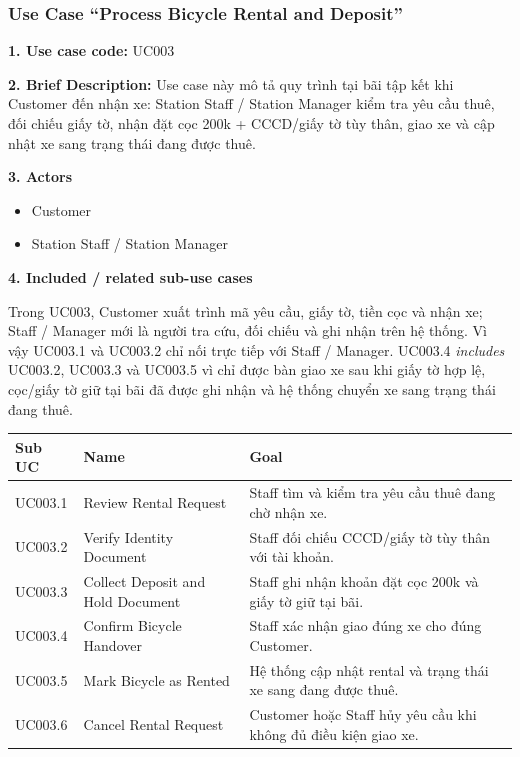 \newpage
\subsubsection{Use Case ``Process Bicycle Rental and Deposit''}

\textbf{1. Use case code:} UC003

\textbf{2. Brief Description:} Use case này mô tả quy trình tại bãi tập kết khi
Customer đến nhận xe: Station Staff / Station Manager kiểm tra yêu cầu thuê, đối
chiếu giấy tờ, nhận đặt cọc 200k + CCCD/giấy tờ tùy thân, giao xe và cập nhật xe
sang trạng thái đang được thuê.

\textbf{3. Actors}
\begin{itemize}
  \item Customer
  \item Station Staff / Station Manager
\end{itemize}

\textbf{4. Included / related sub-use cases}

Trong UC003, Customer xuất trình mã yêu cầu, giấy tờ, tiền cọc và nhận xe; Staff
/ Manager mới là người tra cứu, đối chiếu và ghi nhận trên hệ thống. Vì vậy
UC003.1 và UC003.2 chỉ nối trực tiếp với Staff / Manager. UC003.4
\textit{includes} UC003.2, UC003.3 và UC003.5 vì chỉ được bàn giao xe sau khi
giấy tờ hợp lệ, cọc/giấy tờ giữ tại bãi đã được ghi nhận và hệ thống chuyển xe
sang trạng thái đang thuê.

\begin{longtable}{P{0.18\textwidth}P{0.30\textwidth}P{0.42\textwidth}}
\toprule
\textbf{Sub UC} & \textbf{Name} & \textbf{Goal} \\
\midrule
UC003.1 & Review Rental Request & Staff tìm và kiểm tra yêu cầu thuê đang chờ nhận xe. \\
UC003.2 & Verify Identity Document & Staff đối chiếu CCCD/giấy tờ tùy thân với tài khoản. \\
UC003.3 & Collect Deposit and Hold Document & Staff ghi nhận khoản đặt cọc 200k và giấy tờ giữ tại bãi. \\
UC003.4 & Confirm Bicycle Handover & Staff xác nhận giao đúng xe cho đúng Customer. \\
UC003.5 & Mark Bicycle as Rented & Hệ thống cập nhật rental và trạng thái xe sang đang được thuê. \\
UC003.6 & Cancel Rental Request & Customer hoặc Staff hủy yêu cầu khi không đủ điều kiện giao xe. \\
\bottomrule
\end{longtable}

